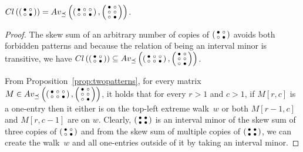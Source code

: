 \begin{prop}
$Cl\left(\left(\begin{smallmatrix}\bullet&\circ\\\circ&\bullet\end{smallmatrix}\right)\right)=Av_{\preceq}\left(\left(\begin{smallmatrix}\bullet&\circ&\circ\\\circ&\circ&\bullet\end{smallmatrix}\right),\left(\begin{smallmatrix}\bullet&\circ\\\circ&\circ\\\circ&\bullet\end{smallmatrix}\right)\right)$.
\end{prop}
\begin{proof}
The skew sum of an arbitrary number of copies of $\left(\begin{smallmatrix}\bullet&\circ\\\circ&\bullet\end{smallmatrix}\right)$ avoids both forbidden patterns and because the relation of being an interval minor is transitive, we have $Cl\left(\left(\begin{smallmatrix}\bullet&\circ\\\circ&\bullet\end{smallmatrix}\right)\right)\subseteq Av_{\preceq}\left(\left(\begin{smallmatrix}\bullet&\circ&\circ\\\circ&\circ&\bullet\end{smallmatrix}\right),\left(\begin{smallmatrix}\bullet&\circ\\\circ&\circ\\\circ&\bullet\end{smallmatrix}\right)\right)$.

From Proposition~\ref{prop:twopatterns}, for every matrix~$M\in Av_{\preceq}\left(\left(\begin{smallmatrix}\bullet&\circ&\circ\\\circ&\circ&\bullet\end{smallmatrix}\right),\left(\begin{smallmatrix}\bullet&\circ\\\circ&\circ\\\circ&\bullet\end{smallmatrix}\right)\right)$, it holds that for every $r>1$ and $c>1$, if $M[r,c]$ is a one-entry then it either is on the top-left extreme walk~$w$ or both $M[r-1,c]$ and $M[r,c-1]$ are on $w$. Clearly, $\left(\begin{smallmatrix}\bullet&\bullet\\\bullet&\bullet\end{smallmatrix}\right)$ is an interval minor of the skew sum of three copies of $\left(\begin{smallmatrix}\bullet&\circ\\\circ&\bullet\end{smallmatrix}\right)$ and from the skew sum of multiple copies of $\left(\begin{smallmatrix}\bullet&\bullet\\\bullet&\bullet\end{smallmatrix}\right)$, we can create the walk~$w$ and all one-entries outside of it by taking an interval minor.
\end{proof}


